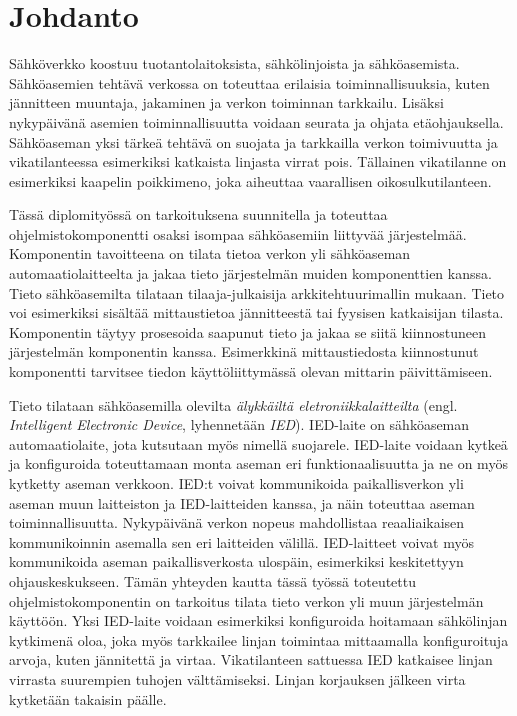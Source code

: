 \chapter{Johdanto}
\label{ch:johdanto}
Sähköverkko koostuu tuotantolaitoksista, sähkölinjoista ja sähköasemista. Sähköasemien tehtävä verkossa on toteuttaa erilaisia toiminnallisuuksia, kuten jännitteen muuntaja, jakaminen ja verkon toiminnan tarkkailu. Lisäksi nykypäivänä asemien toiminnallisuutta voidaan seurata ja ohjata etäohjauksella. Sähköaseman yksi tärkeä tehtävä on suojata ja tarkkailla verkon toimivuutta ja vikatilanteessa esimerkiksi katkaista linjasta virrat pois. Tällainen vikatilanne on esimerkiksi kaapelin poikkimeno, joka aiheuttaa vaarallisen oikosulkutilanteen.

Tässä diplomityössä on tarkoituksena suunnitella ja toteuttaa ohjelmistokomponentti osaksi isompaa sähköasemiin liittyvää järjestelmää. Komponentin tavoitteena on tilata tietoa verkon yli sähköaseman automaatiolaitteelta ja jakaa tieto järjestelmän muiden komponenttien kanssa. Tieto sähköasemilta tilataan tilaaja-julkaisija arkkitehtuurimallin mukaan. Tieto voi esimerkiksi sisältää mittaustietoa jännitteestä tai fyysisen katkaisijan tilasta. Komponentin täytyy prosesoida saapunut tieto ja jakaa se siitä kiinnostuneen järjestelmän komponentin kanssa. Esimerkkinä mittaustiedosta kiinnostunut komponentti tarvitsee tiedon käyttöliittymässä olevan mittarin päivittämiseen.

Tieto tilataan sähköasemilla olevilta \emph{älykkäiltä eletroniikkalaitteilta} (engl. \emph{Intelligent Electronic Device}, lyhennetään \emph{IED}). IED-laite on sähköaseman automaatiolaite, jota kutsutaan myös nimellä suojarele. IED-laite voidaan kytkeä ja konfiguroida toteuttamaan monta aseman eri funktionaalisuutta ja ne on myös kytketty aseman verkkoon. IED:t voivat kommunikoida paikallisverkon yli aseman muun laitteiston ja IED-laitteiden kanssa, ja näin toteuttaa aseman toiminnallisuutta. Nykypäivänä verkon nopeus mahdollistaa reaaliaikaisen kommunikoinnin asemalla sen eri laitteiden välillä. IED-laitteet voivat myös kommunikoida aseman paikallisverkosta ulospäin, esimerkiksi keskitettyyn ohjauskeskukseen. Tämän yhteyden kautta tässä työssä toteutettu ohjelmistokomponentin on tarkoitus tilata tieto verkon yli muun järjestelmän käyttöön. Yksi IED-laite voidaan esimerkiksi konfiguroida hoitamaan sähkölinjan kytkimenä oloa, joka myös tarkkailee linjan toimintaa mittaamalla konfiguroituja arvoja, kuten jännitettä ja virtaa. Vikatilanteen sattuessa IED katkaisee linjan virrasta suurempien tuhojen välttämiseksi. Linjan korjauksen jälkeen virta kytketään takaisin päälle.

